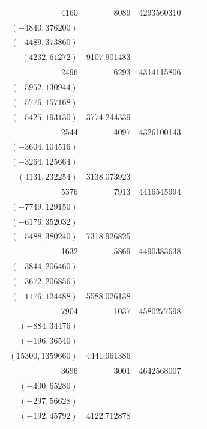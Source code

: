 \documentclass[11pt]{article}
\begin{document}
\begin{longtable}{r r r l r}
4160 & 8089 & 4293560310 & \begin{tabular}[t]{@{}l@{}}$(-6728,315752)$\\$(-4840,376200)$\\$(-4489,373860)$\\$(4232,61272)$\end{tabular} & 9107.901483\\[5pt]
2496 & 6293 & 4314115806 & \begin{tabular}[t]{@{}l@{}}$(-6292,7436)$\\$(-5952,130944)$\\$(-5776,157168)$\\$(-5425,193130)$\end{tabular} & 3774.244339\\[5pt]
2544 & 4097 & 4326100143 & \begin{tabular}[t]{@{}l@{}}$(-3856,77120)$\\$(-3604,104516)$\\$(-3264,125664)$\\$(4131,232254)$\end{tabular} & 3138.073923\\[5pt]
5376 & 7913 & 4416545994 & \begin{tabular}[t]{@{}l@{}}$(-7776,118368)$\\$(-7749,129150)$\\$(-6176,352032)$\\$(-5488,380240)$\end{tabular} & 7318.926825\\[5pt]
1632 & 5869 & 4490383638 & \begin{tabular}[t]{@{}l@{}}$(-5292,145404)$\\$(-3844,206460)$\\$(-3672,206856)$\\$(-1176,124488)$\end{tabular} & 5588.026138\\[5pt]
7904 & 1037 & 4580277598 & \begin{tabular}[t]{@{}l@{}}$(-988,20748)$\\$(-884,34476)$\\$(-196,36540)$\\$(15300,1359660)$\end{tabular} & 4441.961386\\[5pt]
3696 & 3001 & 4642568007 & \begin{tabular}[t]{@{}l@{}}$(-1372,106428)$\\$(-400,65280)$\\$(-297,56628)$\\$(-192,45792)$\end{tabular} & 4122.712878\\[5pt]

\end{longtable}
\end{document}
